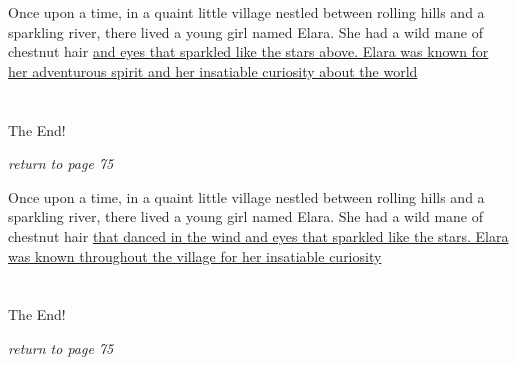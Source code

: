 \documentclass{memoir}
\begin{document}
        


        \hspace{1cm}\vfill
        \begin{minipage}{3in}
        \LARGE
        Once upon a time, in a quaint little village nestled between rolling hills and a sparkling river, there lived a young girl named Elara. She had a wild mane of chestnut hair \ul{and eyes that sparkled like the stars above. Elara was known for her adventurous spirit and her insatiable curiosity about the world}\\ \vspace{5mm} \\
 \\\vspace{1cm} The End! \\ 

        \hspace{1cm}\begin{minipage}{6cm}
        \normalsize
            \hfill \textit{return to page 75}
        \end{minipage} 
        \end{minipage}
        \hspace{1cm}\vfill
        \cleardoublepage

        


        \hspace{1cm}\vfill
        \begin{minipage}{3in}
        \LARGE
        Once upon a time, in a quaint little village nestled between rolling hills and a sparkling river, there lived a young girl named Elara. She had a wild mane of chestnut hair \ul{that danced in the wind and eyes that sparkled like the stars. Elara was known throughout the village for her insatiable curiosity}\\ \vspace{5mm} \\
 \\\vspace{1cm} The End! \\ 

        \hspace{1cm}\begin{minipage}{6cm}
        \normalsize
            \hfill \textit{return to page 75}
        \end{minipage} 
        \end{minipage}
        \hspace{1cm}\vfill
        \cleardoublepage

        
\end{document}
